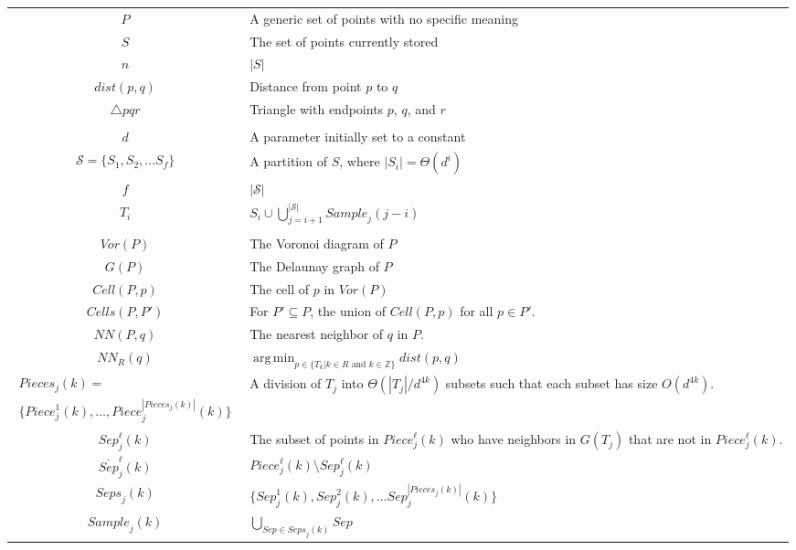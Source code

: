 \documentclass[10pt,a4paper]{amsart}
\newcommand{\Cell}{\mathit{Cell}}
\newcommand{\Cells}{\mathit{Cells}}
\newcommand{\Sample}{\mathit{Sample}}
\newcommand{\Piece}{\mathit{Piece}}
\newcommand{\Pieces}{\mathit{Pieces}}
\newcommand{\Sep}{\mathit{Sep}}
\newcommand{\Seps}{\mathit{Seps}}
\newcommand{\NN}{\mathit{NN}}
\newcommand{\mcS}{\mathcal{S}}
\newcommand{\Voron}{\mathit{Vor}}
\DeclareMathOperator*{\argmin}{arg\,min}
\providecommand{\cal}{\mathcal}
\begin{document}





\begin{table} \small 
\begin{tabular}{|c|p{3.5in}|}\hline
$P$ & A generic set of points with no specific meaning \\
$S$ & The set of points currently stored \\
$n$ & $|S|$ \\
$dist(p,q)$ & Distance from point $p$ to $q$\\
$\triangle pqr$ & Triangle with endpoints $p$, $q$, and $r$\\
    &       \\
$d$ & A parameter initially set to a constant\\
${\cal S}=\{ S_1, S_2, \ldots S_{f} \}$ & A partition of $S$, where $|S_i|=\Theta(d^i)$ \\  
$f$ & $|{\cal S}|$\\
$T_i$ & $S_i \cup \bigcup_{j=i+1}^{|\mcS|} \Sample_j(j-i)$\\
      &    \\
$\Voron(P)$ & The Voronoi diagram of $P$ \\
$G(P)$ &  The Delaunay graph of $P$ \\
$\Cell(P,p)$ & The cell of $p$ in $\Voron(P)$ \\
$\Cells(P,P')$ & For $P' \subseteq P$, the union of $\Cell(P,p)$ for all $p \in P'$. \\
$\NN(P,q)$ & The nearest neighbor of $q$ in $P$.\\
$\NN_R(q)$ & $\argmin_{p\in \{ T_k|k\in R  \text{ and } k \in \mathbb{Z}\}}dist(p,q)$\\
$\begin{array}{c}
\Pieces_j(k) = \\ \{\Piece^1_j(k),  \ldots, \Piece^{|\Pieces_j(k)|}_j(k)\}
\end{array}$
& A division of $T_j$ into $\Theta(|T_j|/d^{4k})$ subsets such that each subset has size $O(d^{4k})$.
\\
$\Sep^\ell_j(k)$ &  The subset of points in $\Piece^\ell_j(k)$ who have neighbors in $G(T_j)$ that are not in $\Piece^\ell_j(k)$.  
\\
$\overline{Sep}_j^\ell(k)$ & $\Piece_j^\ell(k) \setminus \Sep_j^\ell(k)$
\\
$\Seps_j(k)$ & $\{\Sep_j^1(k), \Sep^2_j(k), \ldots  \Sep^{|\Pieces_j(k)|}_j(k)\}$
\\
$\Sample_j(k)$ & $\bigcup_{Sep \in \Seps_j(k)} Sep$ \\

\end{tabular}
\end{table}
\end{document}

